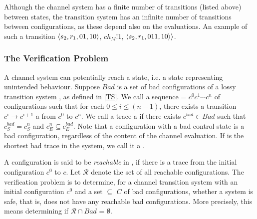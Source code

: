 Although the channel system has a finite number of transitions (listed above) between states, the transition system has an infinite number of transitions between configurations, as these depend also on the evaluations. An example of such a transition $\langle s_2,r_1,01,10\rangle$, $ch_M!1$, $\langle s_2,r_1,011,10\rangle\rangle$.

\subsubsection{The Verification Problem}
A channel system can potentially reach a  state, i.e. a state representing unintended behaviour. Suppose $Bad$ is a set of bad configurations of a lossy transition system , as defined in \ref{TS}. We call a sequence  = $c^0c^1\cdots c^n$ of configurations such that for each $0 \leq i \leq (n-1)$, there exists a transition $c^i \rightarrow c^{i+1}$ a  from $c^0$ to $c^n$. We call a trace a  if there exists $c^{bad} \in Bad$ such that $c^{bad}_S = c^n_S$ and $c^n_E \subseteq c^{bad}_E$. Note that a configuration with a bad control state is a bad configuration, regardless of the content of the channel evaluation. If  is the shortest bad trace in the system, we call it a .

A configuration  is said to be \emph{reachable} in , if there is a trace from the initial configuration $c^0$ to $c$. Let $\mathcal{R}$ denote the set of all reachable configurations. The verification problem is to determine, for a channel transition system  with an initial configuration $c^0$ and a set  $\subseteq$ $C$ of bad configurations, whether a system is safe, that is, does not have any reachable bad configurations. More precisely, this means determining if $\mathcal{R} \cap Bad$ = $\emptyset$.







